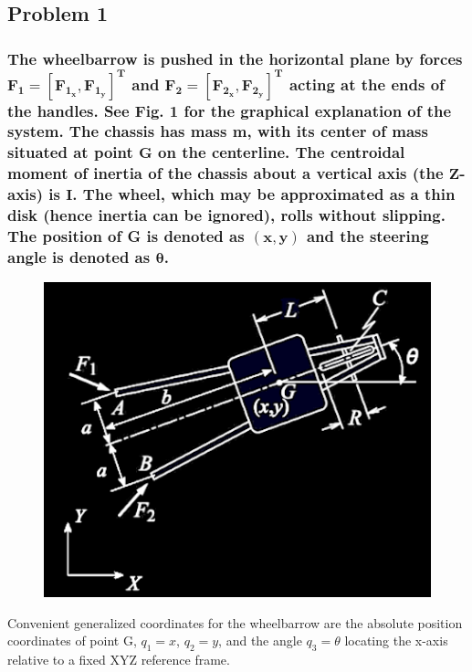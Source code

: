 \documentclass[12pt, letterpaper]{../assignment}
\begin{document}
\subsection*{Problem 1}
\subsubsection*{The wheelbarrow is pushed in the horizontal plane by forces $\bm{F_1 = [F_{1_x}, F_{1_y}]^T}$ and $\bm{F_2 = [F_{2_x}, F_{2_y}]^T}$ acting at the ends of the handles.
See Fig. 1 for the graphical explanation of the system.
The chassis has mass m, with its center of mass situated at point $\bm{G}$ on the centerline.
The centroidal moment of inertia of the chassis about a vertical axis (the $\bm{Z}$-axis) is $\bm{I}$.
The wheel, which may be approximated as a thin disk (hence inertia can be ignored),
rolls without slipping.
The position of G is denoted as $\bm{(x, y)}$ and the steering angle is denoted as $\bm{\theta}$.}


\begin{figure}[H]
  \centering
  \includegraphics[scale=0.5,frame]{images/Problem_1.png}
\end{figure}

Convenient generalized coordinates for the wheelbarrow are the absolute position coordinates of point G, 
$q_1 = x$, $q_2 = y$, and the angle $q_3= \theta$ locating the x-axis relative to a fixed XYZ reference frame.
\\\\
\end{document}
